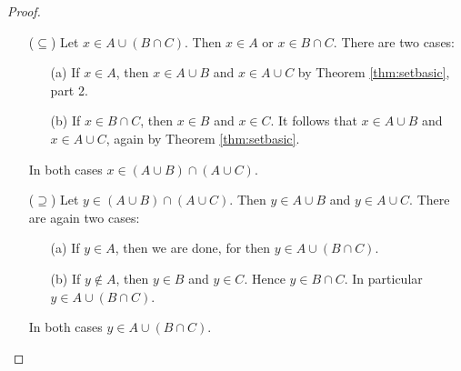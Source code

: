 \begin{proof}
\begin{itemize}
  \item[($\subseteq$)] Let $x\in A\cup (B\cap C)$. Then $x\in A$ or $x\in B\cap C$. There are two cases:
  \begin{itemize}
    \item[(a)] If $x\in A$, then $x\in A\cup B$ and $x\in A\cup C$ by Theorem \ref{thm:setbasic}, part 2.
    \item[(b)] If $x\in B\cap C$, then $x\in B$ and $x\in C$. It follows that $x\in A\cup B$ and $x\in A\cup C$, again by Theorem \ref{thm:setbasic}.
  \end{itemize}
  In both cases $x\in (A\cup B)\cap(A\cup C)$.
  \item[($\supseteq$)] Let $y\in (A\cup B)\cap(A\cup C)$. Then $y\in A\cup B$ and $y\in A\cup C$. There are again two cases:
  \begin{itemize}
    \item[(a)] If $y\in A$, then we are done, for then $y\in A\cup (B\cap C)$.
    \item[(b)] If $y\notin A$, then $y\in B$ and $y\in C$. Hence $y\in B\cap C$. In particular $y\in A\cup (B\cap C)$.
  \end{itemize}
  In both cases $y\in A\cup (B\cap C)$.\qedhere
\end{itemize}
\end{proof}

% 

